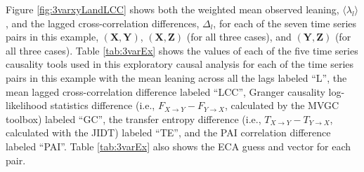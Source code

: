 Figure \ref{fig:3varxyLandLCC} shows both the weighted mean observed leaning, $\langle \lambda_l\rangle$, and the lagged cross-correlation differences, $\Delta_l$, for each of the seven time series pairs in this example, $(\mathbf{X},\mathbf{Y})$, $(\mathbf{X},\mathbf{Z})$ (for all three cases), and $(\mathbf{Y},\mathbf{Z})$ (for all three cases).  Table \ref{tab:3varEx} shows the values of each of the five time series causality tools used in this exploratory causal analysis for each of the time series pairs in this example with the mean leaning across all the lags labeled ``L'', the mean lagged cross-correlation difference labeled ``LCC'', Granger causality log-likelihood statistics difference (i.e., $F_{X\rightarrow Y}-F_{Y\rightarrow X}$, calculated by the MVGC toolbox) labeled ``GC'', the transfer entropy difference (i.e., $T_{X\rightarrow Y}-T_{Y\rightarrow X}$, calculated with the JIDT) labeled ``TE'', and the PAI correlation difference labeled ``PAI''.  Table \ref{tab:3varEx} also shows the ECA guess and vector for each pair.
